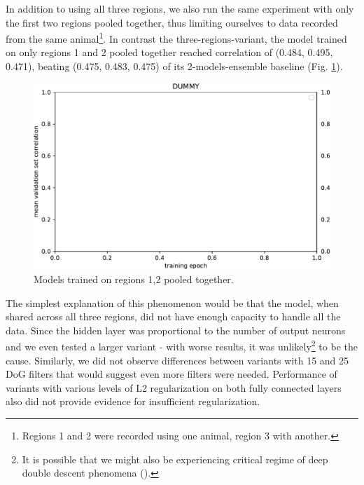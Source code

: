 In addition to using all three regions, we also run the same experiment with only the first two regions pooled together, thus limiting ourselves to data recorded from the same animal\footnote{Regions 1 and 2 were recorded using one animal, region 3 with another.}. In contrast the three-regions-variant, the model trained on only regions 1 and 2 pooled together reached correlation of (0.484, 0.495, 0.471), beating (0.475, 0.483, 0.475) of its 2-models-ensemble baseline (Fig. \ref{fig:5.3.1.1_2}).

\begin{figure}[H]
    \centering
    \includegraphics[width=1\textwidth]{../figures/05_dummy}
    \caption[Experiment 5.3.1.1 2]{Models trained on regions 1,2 pooled together\protect\footnotemark.}
    \label{fig:5.3.1.1_2}
\end{figure}

The simplest explanation of this phenomenon would be that the model, when shared across all three regions, did not have enough capacity to handle all the data. Since the hidden layer was proportional to the number of output neurons and we even tested a larger variant - with worse results, it was unlikely\footnote{It is possible that we might also be experiencing critical regime of deep double descent phenomena (\cite{2019arXiv191202292N}).} to be the cause. Similarly, we did not observe differences between variants with 15 and 25 DoG filters that would suggest even more filters were needed. Performance of variants with various levels of L2 regularization on both fully connected layers also did not provide evidence for insufficient regularization. 

